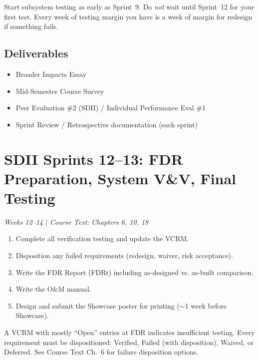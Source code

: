 \documentclass[11pt,letterpaper]{article}
\begin{document}
\begin{protip}
Start subsystem testing as early as Sprint~9. Do \emph{not} wait until Sprint~12 for your first test. Every week of testing margin you have is a week of margin for redesign if something fails.
\end{protip}

\subsection{Deliverables}
\begin{itemize}[nosep,leftmargin=1.5em]
\item Broader Impacts Essay
\item Mid-Semester Course Survey
\item Peer Evaluation \#2 (SDII) / Individual Performance Eval \#1
\item Sprint Review / Retrospective documentation (each sprint)
\end{itemize}


\section{SDII Sprints 12--13: FDR Preparation, System V\&V, Final Testing}
\textit{Weeks 12--14 $|$ Course Text: Chapters 6, 10, 18}

\begin{priorities}
\begin{enumerate}[nosep]
\item Complete all verification testing and update the VCRM.
\item Disposition any failed requirements (redesign, waiver, risk acceptance).
\item Write the FDR Report (FDRt) including as-designed vs. as-built comparison.
\item Write the O\&M manual.
\item Design and submit the Showcase poster for printing ($\sim$1 week before Showcase).
\end{enumerate}
\end{priorities}

\begin{warnbox}
A VCRM with mostly ``Open'' entries at FDR indicates insufficient testing. Every requirement must be dispositioned: Verified, Failed (with disposition), Waived, or Deferred. See Course Text Ch.~6 for failure disposition options.
\end{warnbox}
\end{document}
